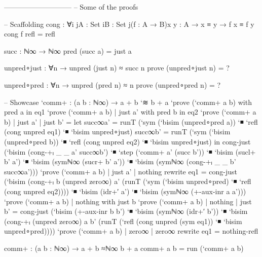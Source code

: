 \begin{code}[hide]
-----------------------------
-- Some of the proofs

-- Scaffolding
cong : ∀{i j}{A : Set i}{B : Set j}(f : A → B){x y : A} → x ≡ y → f x ≡ f y
cong f refl = refl

succ : ℕ∞ → ℕ∞
pred (succ a) = just a

unpred∘just : ∀{n} → unpred (just n) ≈ succ n
prove (unpred∘just {n}) = ?

unpred∘pred : ∀{n} → unpred (pred n) ≈ n
prove (unpred∘pred {n}) = ?

-- Showcase
`comm+ : (a b : ℕ∞) → a + b `≋ b + a
`prove (`comm+ a b) with pred a in eq1
`prove (`comm+ a b) | just a' with pred b in eq2
`prove (`comm+ a b) | just a' | just b' = let succ∞a' = runT (`sym (`bisim (unpred∘pred {a})) `◾ `refl (cong unpred eq1) `◾ `bisim unpred∘just)
                                              succ∞b' = runT (`sym (`bisim (unpred∘pred {b})) `◾ `refl (cong unpred eq2) `◾ `bisim unpred∘just)
                                          in cong-just (`bisim (cong-+ₗ _ _ a' succ∞b')
                                                    `◾ `step (`comm+ a' (succ b'))
                                                    `◾ `bisim (sucl+ b' a')
                                                    `◾ `bisim (symℕ∞ (sucr+ b' a'))
                                                    `◾ `bisim (symℕ∞ (cong-+ₗ _ _ b' succ∞a')))
`prove (`comm+ a b) | just a' | nothing rewrite eq1 = cong-just (`bisim (cong-+ₗ b (unpred zero∞) a' (runT (`sym (`bisim unpred∘pred) `◾ `refl (cong unpred eq2))))
                                                           `◾ `bisim (idr+′ a')
                                                           `◾ `bisim (symℕ∞ (+-aux-inr a a')))
`prove (`comm+ a b) | nothing with just b
`prove (`comm+ a b) | nothing | just b' = cong-just (`bisim (+-aux-inr b b')
                                               `◾ `bisim (symℕ∞ (idr+′ b'))
                                               `◾ `bisim (cong-+ₗ (unpred zero∞) a b' (runT (`refl (cong unpred (sym eq1)) `◾ `bisim unpred∘pred))))
`prove (`comm+ a b) | zero∞ | zero∞ rewrite eq1 = nothing-refl

comm+ : (a b : ℕ∞) → a + b ≈ℕ∞ b + a
comm+ a b = run (`comm+ a b)

\end{code}
